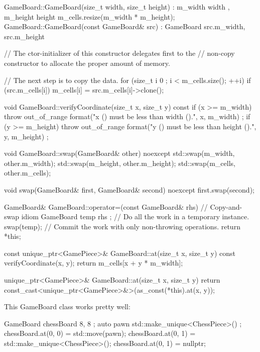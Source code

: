 \begin{cpp}
GameBoard::GameBoard(size_t width, size_t height)
    : m_width { width }, m_height { height }
{
    m_cells.resize(m_width * m_height);
}
GameBoard::GameBoard(const GameBoard& src)
    : GameBoard { src.m_width, src.m_height }
{
    // The ctor-initializer of this constructor delegates first to the
    // non-copy constructor to allocate the proper amount of memory.

    // The next step is to copy the data.
    for (size_t i { 0 }; i < m_cells.size(); ++i) {
        if (src.m_cells[i]) {
            m_cells[i] = src.m_cells[i]->clone();
        }
    }
}

void GameBoard::verifyCoordinate(size_t x, size_t y) const
{
    if (x >= m_width) {
        throw out_of_range {
            format("x ({}) must be less than width ({}).", x, m_width) };
    }
    if (y >= m_height) {
        throw out_of_range {
            format("y ({}) must be less than height ({}).", y, m_height) };
    }
}

void GameBoard::swap(GameBoard& other) noexcept
{
    std::swap(m_width, other.m_width);
    std::swap(m_height, other.m_height);
    std::swap(m_cells, other.m_cells);
}

void swap(GameBoard& first, GameBoard& second) noexcept
{
    first.swap(second);
}

GameBoard& GameBoard::operator=(const GameBoard& rhs)
{
    // Copy-and-swap idiom
    GameBoard temp { rhs }; // Do all the work in a temporary instance.
    swap(temp); // Commit the work with only non-throwing operations.
    return *this;
}

const unique_ptr<GamePiece>& GameBoard::at(size_t x, size_t y) const
{
    verifyCoordinate(x, y);
    return m_cells[x + y * m_width];
}

unique_ptr<GamePiece>& GameBoard::at(size_t x, size_t y)
{
    return const_cast<unique_ptr<GamePiece>&>(as_const(*this).at(x, y));
}
\end{cpp}

This GameBoard class works pretty well:

\begin{cpp}
GameBoard chessBoard { 8, 8 };
auto pawn { std::make_unique<ChessPiece>() };
chessBoard.at(0, 0) = std::move(pawn);
chessBoard.at(0, 1) = std::make_unique<ChessPiece>();
chessBoard.at(0, 1) = nullptr;
\end{cpp}


